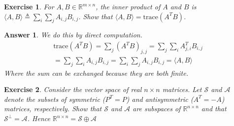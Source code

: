 \documentclass[12pt]{article}
\theoremstyle{colon}
\newtheorem{exercise}{Exercise}
\newtheorem*{answer}{Answer}
\begin{document}
\clearpage

\begin{exercise}
  For $A, B \in \mathbb{R}^{m \times n}$, the inner product of $A$ and $B$ is $\langle A, B \rangle \triangleq \sum_i \sum_j A_{i,j} B_{i,j}$. Show that $\langle A, B \rangle = \text{trace} (A^T B)$.
\end{exercise}

\begin{answer}
  We do this by direct computation.
  \begin{gather*}
    \text{trace}(A^T B) = \sum_j (A^T B)_{j, j} = \sum_j \sum_i A_{j,i}^T B_{i,j} \\
    = \sum_j \sum_i A_{i,j} B_{i,j} = \sum_i \sum_j A_{i,j} B_{i,j} = \langle A, B \rangle
  \end{gather*}
  Where the sum can be exchanged because they are both finite.
\end{answer}

\clearpage

\begin{exercise}
  Consider the vector space of real $n \times n$ matrices. Let $\mathcal{S}$ and $\mathcal{A}$ denote the subsets of symmetric ($P^T = P$) and antisymmetric ($A^T = -A$) matrices, respectively. Show that $\mathcal{S}$ and $\mathcal{A}$ are subspaces of $\mathbb{R}^{n \times n}$ and that $\mathcal{S}^{\perp} = \mathcal{A}$. Hence $\mathbb{R}^{n \times n} = \mathcal{S} \oplus \mathcal{A}$
\end{exercise}
\end{document}

